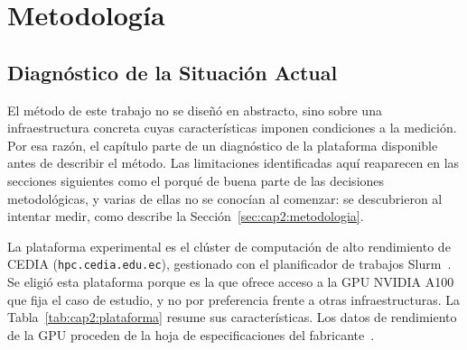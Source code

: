 \chapter{Metodología}
\label{chap:metodologia}

\section{Diagnóstico de la Situación Actual}
\label{sec:cap2:diagnostico}

El método de este trabajo no se diseñó en abstracto, sino sobre una infraestructura concreta cuyas características imponen condiciones a la medición. Por esa razón, el capítulo parte de un diagnóstico de la plataforma disponible antes de describir el método. Las limitaciones identificadas aquí reaparecen en las secciones siguientes como el porqué de buena parte de las decisiones metodológicas, y varias de ellas no se conocían al comenzar: se descubrieron al intentar medir, como describe la Sección~\ref{sec:cap2:metodologia}.

La plataforma experimental es el clúster de computación de alto rendimiento de CEDIA (\texttt{hpc.cedia.edu.ec}), gestionado con el planificador de trabajos Slurm~\cite{yoo2003slurm}.
Se eligió esta plataforma porque es la que ofrece acceso a la GPU NVIDIA A100 que fija el caso de estudio, y no por preferencia frente a otras infraestructuras. La Tabla~\ref{tab:cap2:plataforma} resume sus características. Los datos de rendimiento de la GPU proceden de la hoja de especificaciones del fabricante~\cite{nvidia2021a100}.

